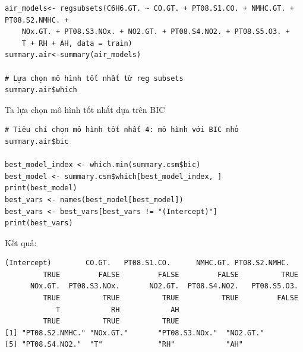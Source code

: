 \begin{lstlisting}
air_models<- regsubsets(C6H6.GT. ~ CO.GT. + PT08.S1.CO. + NMHC.GT. + PT08.S2.NMHC. + 
    NOx.GT. + PT08.S3.NOx. + NO2.GT. + PT08.S4.NO2. + PT08.S5.O3. + 
    T + RH + AH, data = train)
summary.air<-summary(air_models)

# Lựa chọn mô hình tốt nhất từ reg subsets 
summary.air$which
\end{lstlisting}
Ta lựa chọn mô hình tốt nhất dựa trên BIC
\begin{lstlisting}
# Tiêu chí chọn mô hình tốt nhất 4: mô hình với BIC nhỏ
summary.air$bic

best_model_index <- which.min(summary.csm$bic)
best_model <- summary.csm$which[best_model_index, ]
print(best_model)
best_vars <- names(best_model[best_model])
best_vars <- best_vars[best_vars != "(Intercept)"]
print(best_vars)
\end{lstlisting}
Kết quả:
\begin{lstlisting}
(Intercept)        CO.GT.   PT08.S1.CO.      NMHC.GT. PT08.S2.NMHC. 
         TRUE         FALSE         FALSE         FALSE          TRUE 
      NOx.GT.  PT08.S3.NOx.       NO2.GT.  PT08.S4.NO2.   PT08.S5.O3. 
         TRUE          TRUE          TRUE          TRUE         FALSE 
            T            RH            AH 
         TRUE          TRUE          TRUE 
[1] "PT08.S2.NMHC." "NOx.GT."       "PT08.S3.NOx."  "NO2.GT."      
[5] "PT08.S4.NO2."  "T"             "RH"            "AH"           
\end{lstlisting}

